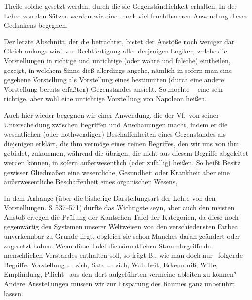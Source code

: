 Theile solche gesetzt werden, durch die sie Gegenständlichkeit erhalten. In der Lehre von den Sätzen werden wir einer noch viel fruchtbareren Anwendung dieses Gedankens begegnen. \par
\gliederungslinie\par
Der letzte Abschnitt, der die  betrachtet,  bietet der Anstöße noch weniger dar. Gleich anfangs  wird zur Rechtfertigung aller derjenigen Logiker, welche die Vorstellungen in richtige und unrichtige (oder wahre und falsche) eintheilen, gezeigt, in welchem Sinne dieß allerdings angehe, nämlich in sofern man eine gegebene Vorstellung als Vorstellung eines bestimmten (durch eine andere Vorstellung bereits erfaßten) Gegenstandes ansieht. So möchte \zB\  eine sehr richtige,  aber wohl eine unrichtige Vorstellung von Napoleon heißen. \par
Auch hier wieder begegnen wir  einer Anwendung, die der Vf.\ von seiner Unterscheidung zwischen Begriffen und Anschauungen macht, indem er die wesentlichen (oder nothwendigen) Beschaffenheiten eines Gegenstandes als diejenigen erklärt, die ihm vermöge eines reinen Begriffes, den wir uns von ihm gebildet, zukommen, während die übrigen, die nicht aus diesem Begriffe abgeleitet werden können, in sofern außerwesentlich (oder zufällig) heißen. So heißt Besitz gewisser Gliedmaßen eine wesentliche, Gesundheit oder Krankheit aber eine außerwesentliche Beschaffenheit eines organischen Wesens, \usw\ \par
In dem Anhange (über die bisherige Darstellungsart der Lehre von den Vorstellungen. S.\,537--571) dürfte das Wichtigste seyn, aber auch den meisten Anstoß erregen die Prüfung der Kantschen Tafel der Kategorien, da diese noch gegenwärtig den Systemen unserer Weltweisen von den verschiedensten Farben unverkennbar zu  Grunde liegt, obgleich sie schon Manches daran geändert oder zugesetzt haben. Wenn diese Tafel die sämmtlichen Stammbegriffe des menschlichen Verstandes enthalten soll, so frägt B., wie man doch nur \zB\ folgende Begriffe: Vorstellung an sich, Satz an sich, Wahrheit, Erkenntniß, Wille, Empfindung, Pflicht \uma\ aus den dort aufgeführten vermeine ableiten zu können? Andere Ausstellungen müssen wir zur Ersparung des Raumes ganz unberührt lassen. \par
\gliederungslinie\par
{}

